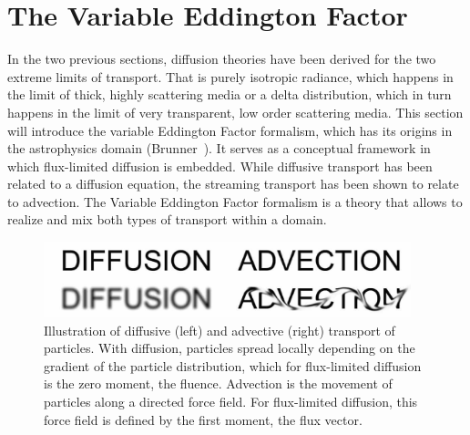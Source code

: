 \section{The Variable Eddington Factor}
\label{sec:fld_vef}

In the two previous sections, diffusion theories have been derived for the two extreme limits of transport. That is purely isotropic radiance, which happens in the limit of thick, highly scattering media or a delta distribution, which in turn happens in the limit of very transparent, low order scattering media. This section will introduce the variable Eddington Factor formalism, which has its origins in the astrophysics domain (Brunner~\cite{Brunner02}). It serves as a conceptual framework in which flux-limited diffusion is embedded. While diffusive transport has been related to a diffusion equation, the streaming transport has been shown to relate to advection. The Variable Eddington Factor formalism is a theory that allows to realize and mix both types of transport within a domain.
\begin{figure}[h]
\centering
\includegraphics[width=0.95\textwidth]{06_fld/figures/fig_diffusion_vs_advection.pdf}
\caption{Illustration of diffusive (left) and advective (right) transport of particles. With diffusion, particles spread locally depending on the gradient of the particle distribution, which for flux-limited diffusion is the zero moment, the fluence. Advection is the movement of particles along a directed force field. For flux-limited diffusion, this force field is defined by the first moment, the flux vector.}
\label{fig:fld_vef_advection_diffusion}
\end{figure}


